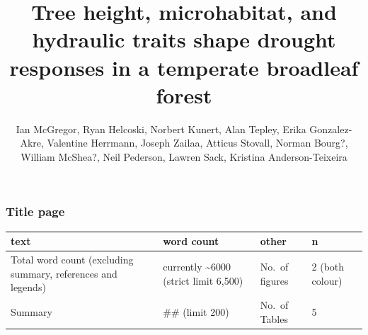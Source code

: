 \documentclass[]{article}
\title{Tree height, microhabitat, and hydraulic traits shape drought responses
in a temperate broadleaf forest}
\author{Ian McGregor, Ryan Helcoski, Norbert Kunert, Alan Tepley, Erika
Gonzalez-Akre, Valentine Herrmann, Joseph Zailaa, Atticus Stovall,
Norman Bourg?, William McShea?, Neil Pederson, Lawren Sack, Kristina
Anderson-Teixeira}
\date{}
\begin{document}
\maketitle

\hypertarget{title-page}{%
\subsubsection{Title page}\label{title-page}}

\begin{longtable}[]{@{}llll@{}}
\toprule
\begin{minipage}[b]{0.35\columnwidth}\raggedright
text\strut
\end{minipage} & \begin{minipage}[b]{0.16\columnwidth}\raggedright
word count\strut
\end{minipage} & \begin{minipage}[b]{0.22\columnwidth}\raggedright
other\strut
\end{minipage} & \begin{minipage}[b]{0.15\columnwidth}\raggedright
n\strut
\end{minipage}\tabularnewline
\midrule
\endhead
\begin{minipage}[t]{0.35\columnwidth}\raggedright
Total word count (excluding summary, references and legends)\strut
\end{minipage} & \begin{minipage}[t]{0.16\columnwidth}\raggedright
currently \textasciitilde{}6000 (strict limit 6,500)\strut
\end{minipage} & \begin{minipage}[t]{0.22\columnwidth}\raggedright
No.~of figures\strut
\end{minipage} & \begin{minipage}[t]{0.15\columnwidth}\raggedright
2 (both colour)\strut
\end{minipage}\tabularnewline
\begin{minipage}[t]{0.35\columnwidth}\raggedright
Summary\strut
\end{minipage} & \begin{minipage}[t]{0.16\columnwidth}\raggedright
\#\# (limit 200)\strut
\end{minipage} & \begin{minipage}[t]{0.22\columnwidth}\raggedright
No.~of Tables\strut
\end{minipage} & \begin{minipage}[t]{0.15\columnwidth}\raggedright
5\strut

\end{minipage}
\end{longtable}
\end{document}
